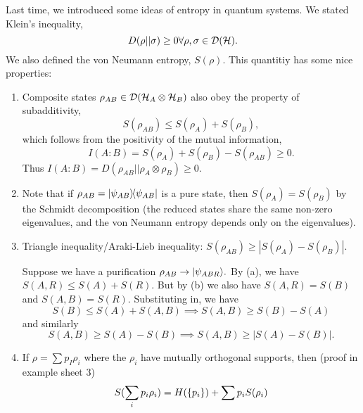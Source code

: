 Last time, we introduced some ideas of entropy in quantum systems. We stated Klein's inequality,
\begin{equation}
    D(\rho||\sigma)\geq 0 \forall \rho,\sigma \in \mathcal{D}(\mathcal H).
\end{equation}
We also defined the von Neumann entropy, $S(\rho)$. This quantitiy has some nice properties:
\begin{enumerate}
    \item Composite states $\rho_{AB}\in \mathcal{D}(\mathcal H_A \otimes \mathcal H_B)$ also obey the property of subadditivity,
    \begin{equation}
        S(\rho_{AB})\leq S(\rho_A) + S(\rho_B),
    \end{equation}
    which follows from the positivity of the mutual information,
    \begin{equation}
        I(A:B)=S(\rho_A)+S(\rho_B)-S(\rho_{AB})\geq 0.
    \end{equation}
    Thus $I(A:B)=D(\rho_{AB}||\rho_A \otimes \rho_B)\geq 0$.
    \item Note that if $\rho_{AB}=\left\lvert{\psi_{AB}}\middle\rangle\!\middle\langle{\psi_{AB}}\right\rvert$ is a pure state, then $S(\rho_A)=S(\rho_B)$ by the Schmidt decomposition (the reduced states share the same non-zero eigenvalues, and the von Neumann entropy depends only on the eigenvalues).
    \item Triangle inequality/Araki-Lieb inequality: $S(\rho_{AB})\geq |S(\rho_A)-S(\rho_B)|$.
    
    Suppose we have a purification $\rho_{AB}\to \lvert\psi_{ABR}\rangle.$ By (a), we have $S(A,R) \leq S(A)+S(R).$
    But by (b) we also have $S(A,R)=S(B)$ and $S(A,B)=S(R).$ Substituting in, we have
    \begin{equation}
        S(B) \leq S(A)+S(A,B) \implies S(A,B) \geq S(B)- S(A)
    \end{equation}
    and similarly
    \begin{equation}
        S(A,B) \geq S(A) -S(B) \implies S(A,B) \geq |S(A)-S(B)|.
    \end{equation}
    \item If $\rho=\sum p_I \rho_i$ where the $\rho_i$ have mutually orthogonal supports, then (proof in example sheet 3)
    \begin{equation}
        S(\sum_i p_i \rho_i) = H(\{p_i\}) +\sum p_i S(\rho_i)
    \end{equation}
\end{enumerate}

